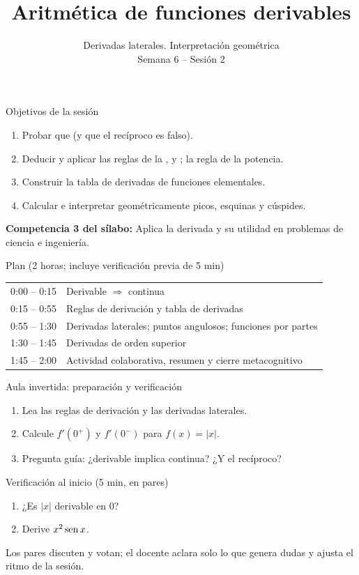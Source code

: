 \documentclass[10pt,aspectratio=169]{beamer}
\title[Reglas de derivación]{Aritmética de funciones derivables}
\subtitle{Derivadas laterales. Interpretación geométrica\\[2pt]\small Semana 6 -- Sesión 2}
\begin{document}
\begin{frame}
  \titlepage
\end{frame}

\begin{frame}{Objetivos de la sesión}
  \begin{enumerate}
    \item Probar que  (y que el recíproco es falso).
    \item Deducir y aplicar las reglas de la ,  y ; la regla de la potencia.
    \item Construir la tabla de derivadas de funciones elementales.
    \item Calcular  e interpretar geométricamente picos, esquinas y cúspides.
  \end{enumerate}
  \vspace{1mm}
  {\small\textbf{Competencia 3 del sílabo:} Aplica la derivada y su utilidad en problemas de ciencia e ingeniería.}
  \begin{block}{Plan (2 horas; incluye verificación previa de 5 min)}
    \begin{tabular}{ll}
      0:00 -- 0:15 & Derivable $\Rightarrow$ continua\\
      0:15 -- 0:55 & Reglas de derivación y tabla de derivadas\\
      0:55 -- 1:30 & Derivadas laterales; puntos angulosos; funciones por partes\\
      1:30 -- 1:45 & Derivadas de orden superior\\
      1:45 -- 2:00 & Actividad colaborativa, resumen y cierre metacognitivo
    \end{tabular}
  \end{block}
\end{frame}

\begin{frame}{Aula invertida: preparación y verificación}
  \small
  \begin{previa}
    \begin{enumerate}
      \item Lea las reglas de derivación y las derivadas laterales.
      \item Calcule $f'(0^+)$ y $f'(0^-)$ para $f(x)=|x|$.
      \item Pregunta guía: ¿derivable implica continua? ¿Y el recíproco?
    \end{enumerate}
  \end{previa}
  \begin{block}{Verificación al inicio (5 min, en pares)}
    \begin{enumerate}
      \item ¿Es $|x|$ derivable en $0$?
      \item Derive $x^2\operatorname{sen} x$.
    \end{enumerate}
    Los pares discuten y votan; el docente aclara solo lo que genera dudas y ajusta el ritmo de la sesión.
  \end{block}
\end{frame}
\end{document}
